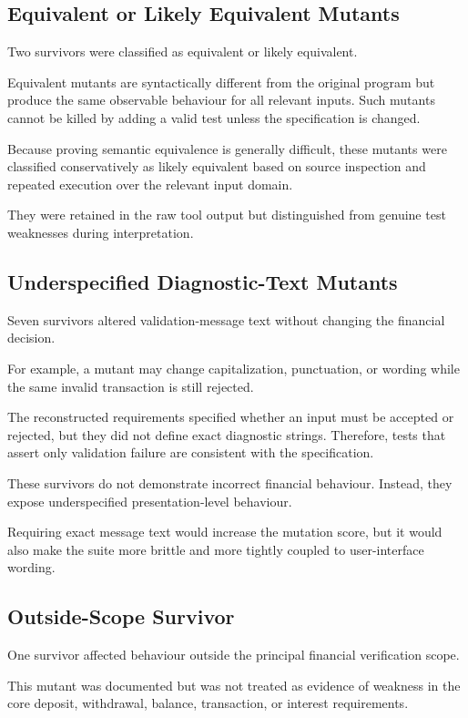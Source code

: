 \documentclass[12pt]{article}
\begin{document}
\subsection{Equivalent or Likely Equivalent Mutants}

Two survivors were classified as equivalent or likely equivalent.

Equivalent mutants are syntactically different from the original program but
produce the same observable behaviour for all relevant inputs. Such mutants
cannot be killed by adding a valid test unless the specification is changed.

Because proving semantic equivalence is generally difficult, these mutants
were classified conservatively as likely equivalent based on source inspection
and repeated execution over the relevant input domain.

They were retained in the raw tool output but distinguished from genuine test
weaknesses during interpretation.

\subsection{Underspecified Diagnostic-Text Mutants}

Seven survivors altered validation-message text without changing the financial
decision.

For example, a mutant may change capitalization, punctuation, or wording while
the same invalid transaction is still rejected.

The reconstructed requirements specified whether an input must be accepted or
rejected, but they did not define exact diagnostic strings. Therefore, tests
that assert only validation failure are consistent with the specification.

These survivors do not demonstrate incorrect financial behaviour. Instead,
they expose underspecified presentation-level behaviour.

Requiring exact message text would increase the mutation score, but it would
also make the suite more brittle and more tightly coupled to user-interface
wording.

\subsection{Outside-Scope Survivor}

One survivor affected behaviour outside the principal financial verification
scope.

This mutant was documented but was not treated as evidence of weakness in the
core deposit, withdrawal, balance, transaction, or interest requirements.
\end{document}
